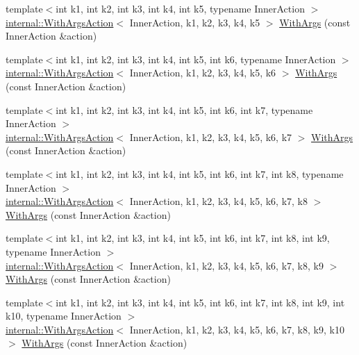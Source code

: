 \begin{DoxyCompactItemize}
\item 
{\footnotesize template$<$int k1, int k2, int k3, int k4, int k5, typename Inner\+Action $>$ }\\\hyperlink{classtesting_1_1internal_1_1_with_args_action}{internal\+::\+With\+Args\+Action}$<$ Inner\+Action, k1, k2, k3, k4, k5 $>$ \hyperlink{namespacetesting_aa36b0c7216df96bdacf9fe491afd40bd}{With\+Args} (const Inner\+Action \&action)
\item 
{\footnotesize template$<$int k1, int k2, int k3, int k4, int k5, int k6, typename Inner\+Action $>$ }\\\hyperlink{classtesting_1_1internal_1_1_with_args_action}{internal\+::\+With\+Args\+Action}$<$ Inner\+Action, k1, k2, k3, k4, k5, k6 $>$ \hyperlink{namespacetesting_a6df9cd27659e5943b5d3d77fc4f102e3}{With\+Args} (const Inner\+Action \&action)
\item 
{\footnotesize template$<$int k1, int k2, int k3, int k4, int k5, int k6, int k7, typename Inner\+Action $>$ }\\\hyperlink{classtesting_1_1internal_1_1_with_args_action}{internal\+::\+With\+Args\+Action}$<$ Inner\+Action, k1, k2, k3, k4, k5, k6, k7 $>$ \hyperlink{namespacetesting_a04146a27847141c6942e9c67a85aadbe}{With\+Args} (const Inner\+Action \&action)
\item 
{\footnotesize template$<$int k1, int k2, int k3, int k4, int k5, int k6, int k7, int k8, typename Inner\+Action $>$ }\\\hyperlink{classtesting_1_1internal_1_1_with_args_action}{internal\+::\+With\+Args\+Action}$<$ Inner\+Action, k1, k2, k3, k4, k5, k6, k7, k8 $>$ \hyperlink{namespacetesting_a16c131c0d58ae07d2e1ee6c7a44aaad1}{With\+Args} (const Inner\+Action \&action)
\item 
{\footnotesize template$<$int k1, int k2, int k3, int k4, int k5, int k6, int k7, int k8, int k9, typename Inner\+Action $>$ }\\\hyperlink{classtesting_1_1internal_1_1_with_args_action}{internal\+::\+With\+Args\+Action}$<$ Inner\+Action, k1, k2, k3, k4, k5, k6, k7, k8, k9 $>$ \hyperlink{namespacetesting_a6aec78e6c201b150c78271e3f851414e}{With\+Args} (const Inner\+Action \&action)
\item 
{\footnotesize template$<$int k1, int k2, int k3, int k4, int k5, int k6, int k7, int k8, int k9, int k10, typename Inner\+Action $>$ }\\\hyperlink{classtesting_1_1internal_1_1_with_args_action}{internal\+::\+With\+Args\+Action}$<$ Inner\+Action, k1, k2, k3, k4, k5, k6, k7, k8, k9, k10 $>$ \hyperlink{namespacetesting_a768a620ad07c6b5822201fa4f15fb4f0}{With\+Args} (const Inner\+Action \&action)

\end{DoxyCompactItemize}
